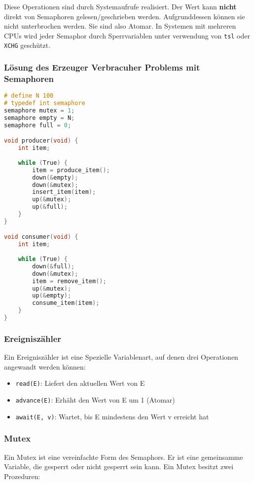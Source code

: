 Diese Operationen sind durch Systemaufrufe realisiert. Der Wert kann
\textbf{nicht} direkt von Semaphoren gelesen/geschrieben werden. Aufgrunddessen
können sie nicht unterbrochen werden. Sie sind also Atomar. In Systemen mit
mehreren CPUs wird jeder Semaphor durch Sperrvariablen unter verwendung von
\texttt{tsl} oder \texttt{XCHG} geschützt.

\subsubsection*{Lösung des Erzeuger Verbracuher Problems mit Semaphoren}

\begin{lstlisting}[language=C]
# define N 100
# typedef int semaphore
semaphore mutex = 1;
semaphore empty = N;
semaphore full = 0;

void producer(void) {
    int item;
    
    while (True) {
        item = produce_item();
        down(&empty);
        down(&mutex);
        insert_item(item);
        up(&mutex);
        up(&full);
    }
} 

void consumer(void) {
    int item;
    
    while (True) {
        down(&full);
        down(&mutex);
        item = remove_item();
        up(&mutex);
        up(&empty);
        consume_item(item);
    }
}
\end{lstlisting}

\subsubsection{Ereigniszähler}

Ein Ereigniszähler ist eine Spezielle Variablenart, auf denen drei Operationen
angewandt werden können:

\begin{itemize}
    \item \texttt{read(E)}: Liefert den aktuellen Wert von E
    \item \texttt{advance(E)}: Erhäht den Wert von E um 1 (Atomar)
    \item \texttt{await(E, v)}: Wartet, bis E mindestens den Wert v erreicht hat
\end{itemize}

\subsubsection{Mutex}

Ein Mutex ist eine vereinfachte Form des Semaphors. Er ist eine gemeinsamme
Variable, die gesperrt oder nicht gesperrt sein kann. Ein Mutex besitzt zwei
Prozeduren:

